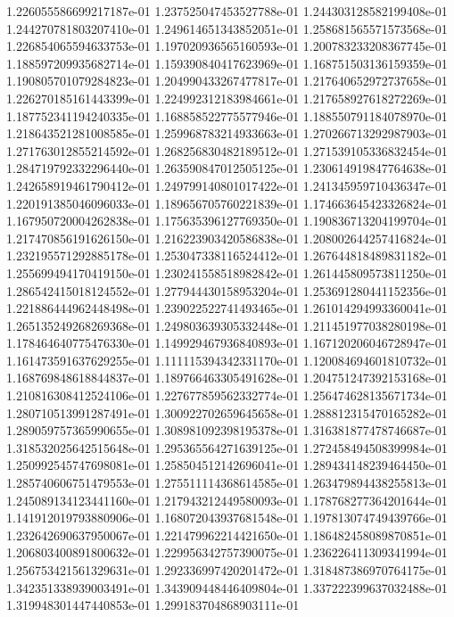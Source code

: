1.226055586699217187e-01
1.237525047453527788e-01
1.244303128582199408e-01
1.244270781803207410e-01
1.249614651343852051e-01
1.258681565571573568e-01
1.226854065594633753e-01
1.197020936565160593e-01
1.200783233208367745e-01
1.188597209935682714e-01
1.159390840417623969e-01
1.168751503136159359e-01
1.190805701079284823e-01
1.204990433267477817e-01
1.217640652972737658e-01
1.226270185161443399e-01
1.224992312183984661e-01
1.217658927618272269e-01
1.187752341194240335e-01
1.168858522775577946e-01
1.188550791184078970e-01
1.218643521281008585e-01
1.259968783214933663e-01
1.270266713292987903e-01
1.271763012855214592e-01
1.268256830482189512e-01
1.271539105336832454e-01
1.284719792332296440e-01
1.263590847012505125e-01
1.230614919847764638e-01
1.242658919461790412e-01
1.249799140801017422e-01
1.241345959710436347e-01
1.220191385046096033e-01
1.189656705760221839e-01
1.174663645423326824e-01
1.167950720004262838e-01
1.175635396127769350e-01
1.190836713204199704e-01
1.217470856191626150e-01
1.216223903420586838e-01
1.208002644257416824e-01
1.232195571292885178e-01
1.253047338116524412e-01
1.267644818489831182e-01
1.255699494170419150e-01
1.230241558518982842e-01
1.261445809573811250e-01
1.286542415018124552e-01
1.277944430158953204e-01
1.253691280441152356e-01
1.221886444962448498e-01
1.239022522741493465e-01
1.261014294993360041e-01
1.265135249268269368e-01
1.249803639305332448e-01
1.211451977038280198e-01
1.178464640775476330e-01
1.149929467936840893e-01
1.167120206046728947e-01
1.161473591637629255e-01
1.111115394342331170e-01
1.120084694601810732e-01
1.168769848618844837e-01
1.189766463305491628e-01
1.204751247392153168e-01
1.210816308412524106e-01
1.227677859562332774e-01
1.256474628135671734e-01
1.280710513991287491e-01
1.300922702659645658e-01
1.288812315470165282e-01
1.289059757365990655e-01
1.308981092398195378e-01
1.316381877478746687e-01
1.318532025642515648e-01
1.295365564271639125e-01
1.272458494508399984e-01
1.250992545747698081e-01
1.258504512142696041e-01
1.289434148239464450e-01
1.285740606751479553e-01
1.275511114368614585e-01
1.263479894438255813e-01
1.245089134123441160e-01
1.217943212449580093e-01
1.178768277364201644e-01
1.141912019793880906e-01
1.168072043937681548e-01
1.197813074749439766e-01
1.232642690637950067e-01
1.221479962214421650e-01
1.186482458089870851e-01
1.206803400891800632e-01
1.229956342757390075e-01
1.236226411309341994e-01
1.256753421561329631e-01
1.292336997420201472e-01
1.318487386970764175e-01
1.342351338939003491e-01
1.343909448446409804e-01
1.337222399637032488e-01
1.319948301447440853e-01
1.299183704868903111e-01
